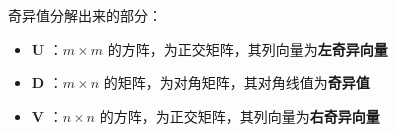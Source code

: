 \begin{notation}
    奇异值分解出来的部分：
    \begin{itemize}
        \item $\bm{U}$ ：$m\times m$ 的方阵，为正交矩阵，其列向量为\textbf{左奇异向量}
        \item $\bm{D}$ ：$m\times n$ 的矩阵，为对角矩阵，其对角线值为\textbf{奇异值}
        \item $\bm{V}$ ：$n\times n$ 的方阵，为正交矩阵，其列向量为\textbf{右奇异向量}
    \end{itemize}
\end{notation}
